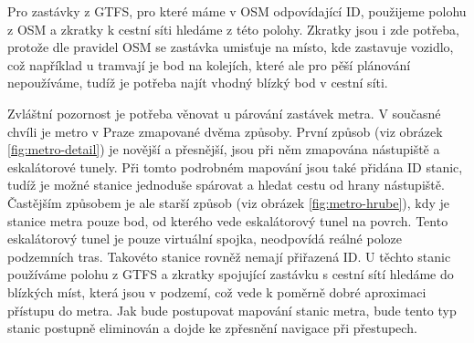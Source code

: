 Pro zastávky z GTFS, pro které máme v OSM odpovídající ID, použijeme polohu z
OSM a zkratky k cestní síti hledáme z této polohy. Zkratky jsou i zde potřeba,
protože dle pravidel OSM \cite{OSM} se zastávka umisťuje na místo, kde zastavuje
vozidlo, což například u tramvají je bod na kolejích, které ale pro pěší
plánování nepoužíváme, tudíž je potřeba najít vhodný blízký bod v cestní síti.

Zvláštní pozornost je potřeba věnovat u párování zastávek metra. V současné
chvíli je metro v Praze zmapované dvěma způsoby. První způsob (viz obrázek 
\ref{fig:metro-detail}) je novější a
přesnější, jsou při něm zmapována nástupiště a eskalátorové tunely. Při tomto
podrobném mapování jsou také přidána ID stanic, tudíž je možné stanice jednoduše
spárovat a hledat cestu od hrany nástupiště. Častějším způsobem je ale starší
způsob (viz obrázek \ref{fig:metro-hrube}), kdy je stanice metra pouze bod, od
kterého vede eskalátorový tunel na
povrch. Tento eskalátorový tunel je pouze virtuální spojka, neodpovídá reálné
poloze podzemních tras. Takovéto stanice rovněž nemají přiřazená ID. U těchto
stanic používáme polohu z GTFS a zkratky spojující zastávku s cestní sítí
hledáme do blízkých míst, která jsou v podzemí, což vede k poměrně dobré
aproximaci přístupu do metra. Jak bude postupovat mapování stanic metra, bude
tento typ stanic postupně eliminován a dojde ke zpřesnění navigace při
přestupech.

